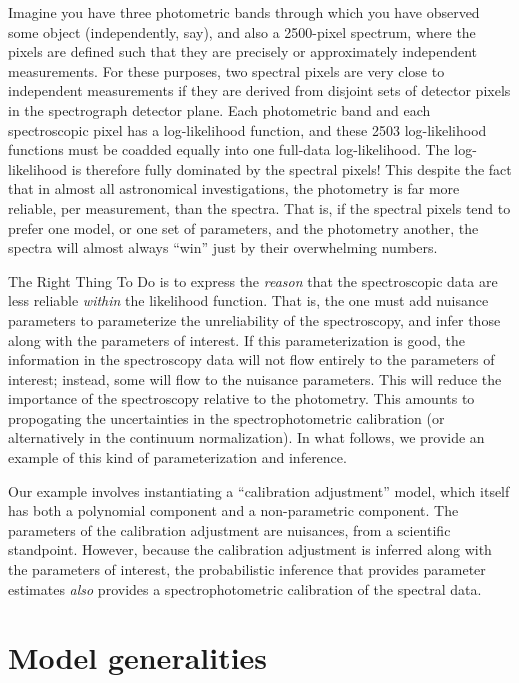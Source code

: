 \documentclass[iop,numberedappendix]{emulateapj}
\begin{document}
Imagine you have three photometric bands through which you have
observed some object (independently, say), and also a 2500-pixel
spectrum, where the pixels are defined such that they are precisely or
approximately independent measurements.
For these purposes, two spectral pixels are very close to independent
measurements if they are derived from disjoint sets of detector pixels
in the spectrograph detector plane.
Each photometric band and each spectroscopic pixel has a
log-likelihood function, and these 2503 log-likelihood functions must
be coadded equally into one full-data
log-likelihood.
The log-likelihood is therefore fully dominated by the spectral
pixels!
This despite the fact that in almost all astronomical investigations,
the photometry is far more reliable, per measurement, than the
spectra.
That is, if the spectral pixels tend to prefer one model, or one set
of parameters, and the photometry another, the spectra will almost
always ``win'' just by their overwhelming numbers.

The Right Thing To Do is to express the \emph{reason} that the
spectroscopic data are less reliable \emph{within} the
likelihood function.
That is, the one must add nuisance parameters to parameterize the
unreliability of the spectroscopy, and infer those along with the
parameters of interest.
If this parameterization is good, the information in the spectroscopy
data will not flow entirely to the parameters of interest; instead,
some will flow to the nuisance parameters.
This will reduce the importance of the spectroscopy relative to the
photometry.
This amounts to propogating the uncertainties in the
spectrophotometric calibration (or alternatively in the continuum
normalization).
In what follows, we provide an example of this kind of
parameterization and inference.

Our example involves instantiating a ``calibration adjustment'' model,
which itself has both a polynomial component and a non-parametric
component.
The parameters of the calibration adjustment are nuisances, from a
scientific standpoint.
However, because the calibration adjustment is inferred along with the
parameters of interest, the probabilistic inference that provides
parameter estimates \emph{also} provides a spectrophotometric
calibration of the spectral data.


\section{Model generalities}
\end{document}
